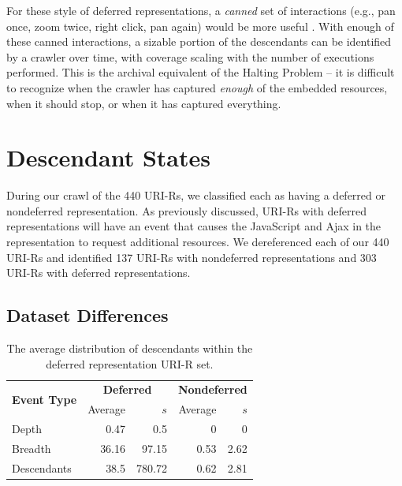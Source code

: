\documentclass{sig-alternate}
\begin{document}
For these style of deferred representations, a \emph{canned} set of interactions (e.g., pan once, zoom twice, right click, pan again) would be more useful \cite{seleniumpjs}. With enough of these canned interactions, a sizable portion of the descendants can be identified by a crawler over time, with coverage scaling with the number of executions performed. This is the archival equivalent of the Halting Problem -- it is difficult to recognize when the crawler has captured \emph{enough} of the embedded resources, when it should stop, or when it has captured everything.

\section{Descendant States}
\label{states}
During our crawl of the 440 URI-Rs, we classified each as having a deferred or nondeferred representation. As previously discussed, URI-Rs with deferred representations will have an event that causes the JavaScript and Ajax in the representation to request additional resources. We dereferenced each of our 440 URI-Rs and identified 137 URI-Rs with nondeferred representations and 303 URI-Rs with deferred representations. 

\subsection{Dataset Differences}
\label{diffs}

\begin{table}
\centering
\begin{tabular}{ l | r | r | r | r }
\multirow{2}{*}{\textbf{Event Type}} & \multicolumn{2}{c}{\textbf{Deferred}} & \multicolumn{2}{c}{\textbf{Nondeferred}} \\
                            & Average         & $s$         & Average   &     $s$    \\
\hline
\hline
Depth & 0.47  & 0.5 & 0 & 0 \\
\hline
Breadth & 36.16  & 97.15 & 0.53 & 2.62 \\
\hline
Descendants & 38.5  & 780.72 & 0.62 & 2.81 \\
\hline
\end{tabular}
  \caption{The average distribution of descendants within the deferred representation URI-R set.}
  \label{depthvbreadth}
\end{table}
\end{document}
